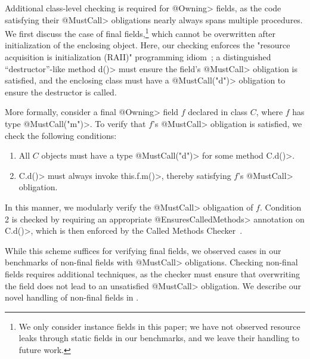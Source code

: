   Additional class-level checking is required for \<@Owning>
  fields, as the code
  satisfying their \<@MustCall> obligations nearly always spans multiple
  procedures.  We first discuss the case of final fields,\footnote{We only
  consider instance fields in this paper; we have not observed resource leaks
  through static fields in our benchmarks, and we leave their handling to future
  work.} which cannot be overwritten after initialization of the enclosing
  object.  Here, our checking enforces the "resource acquisition is
  initialization (RAII)" programming idiom~\cite{raii}; a distinguished
  ``destructor''-like method \<d()> must ensure the field's \<@MustCall> obligation is
  satisfied, and the enclosing class must have a \<@MustCall("d")> obligation to
  ensure the destructor is called.

  More formally, consider a final \<@Owning> field $f$ declared in class $C$,
  where
  $f$ has type \<@MustCall("m")>.  To
  verify that $f$'s \<@MustCall> obligation is satisfied, we check the following
  conditions:
  \begin{enumerate}
    \item All $C$ objects must have a type \<@MustCall("d")> for some method \<C.d()>.
    \item \<C.d()> must always invoke \<this.f.m()>, thereby satisfying $f$'s
    \<@MustCall> obligation.
  \end{enumerate}
  In this manner, we modularly verify the \<@MustCall> obligaation of $f$.  Condition 2 is
  checked by requiring an appropriate \<@EnsuresCalledMethods> annotation on
  \<C.d()>, which is then enforced by the Called Methods
  Checker~\cite{KelloggRSSE2020}.   

  While this scheme suffices for verifying final fields, we observed cases
  in our benchmarks of non-final fields with \<@MustCall> obligations.  Checking
  non-final fields requires additional techniques, as the checker must ensure
  that overwriting the field does not lead to an unsatisfied \<@MustCall> obligation.  We
  describe our novel handling of non-final fields in .


